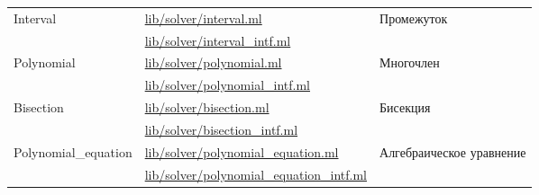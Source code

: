 \begin{centering}
\begin{longtable}{|l|l|l|}
        \multirow{2}{*}{Interval}                             & \href{https://github.com/prekel/chapgame/blob/master/lib/solver/interval.ml}{lib/solver/interval.ml}                                     & \multirow{2}{*}{Промежуток}                   \\\nopagebreak \cline{2-2}
                                                              & \href{https://github.com/prekel/chapgame/blob/master/lib/solver/interval\_intf.ml}{lib/solver/interval\_intf.ml}                         &                                               \\ \hline
        \multirow{2}{*}{Polynomial}                           & \href{https://github.com/prekel/chapgame/blob/master/lib/solver/polynomial.ml}{lib/solver/polynomial.ml}                                 & \multirow{2}{*}{Многочлен}                    \\\nopagebreak \cline{2-2}
                                                              & \href{https://github.com/prekel/chapgame/blob/master/lib/solver/polynomial\_intf.ml}{lib/solver/polynomial\_intf.ml}                     &                                               \\ \hline
        \multirow{2}{*}{Bisection}                            & \href{https://github.com/prekel/chapgame/blob/master/lib/solver/bisection.ml}{lib/solver/bisection.ml}                                   & \multirow{2}{*}{Бисекция}                     \\\nopagebreak \cline{2-2}
                                                              & \href{https://github.com/prekel/chapgame/blob/master/lib/solver/bisection\_intf.ml}{lib/solver/bisection\_intf.ml}                       &                                               \\ \hline
        \multirow{2}{*}{Polynomial\_equation}                 & \href{https://github.com/prekel/chapgame/blob/master/lib/solver/polynomial\_equation.ml}{lib/solver/polynomial\_equation.ml}             & \multirow{2}{3.4cm}{Алгебраическое уравнение} \\\nopagebreak \cline{2-2}
                                                              & \href{https://github.com/prekel/chapgame/blob/master/lib/solver/polynomial\_equation\_intf.ml}{lib/solver/polynomial\_equation\_intf.ml} &                                               \\ \hline
    \end{longtable}
\end{centering}

